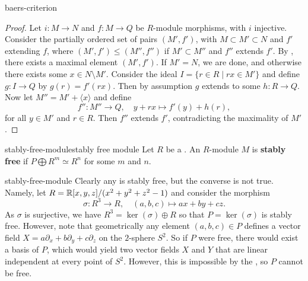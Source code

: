 \begin{example}{baers-criterion}
    \begin{proof}
        Let $i : M \to N$ and $f : M \to Q$ be $R$-module morphisms, with $i$ injective. Consider the partially ordered set of pairs $(M', f')$, with $M \subset M' \subset N$ and $f'$ extending $f$, where $(M', f') \le (M'', f'')$ if $M' \subset M''$ and $f''$ extends $f'$. By , there exists a maximal element $(M', f')$. If $M' = N$, we are done, and otherwise there exists some $x \in N \setminus M'$. Consider the ideal $I = \{ r \in R \mid rx \in M' \}$ and define $g : I \to Q$ by $g(r) = f'(rx)$. Then by assumption $g$ extends to some $h : R \to Q$. Now let $M'' = M' + \langle x \rangle$ and define
        \[ f'' : M'' \to Q, \quad y + rx \mapsto f'(y) + h(r) , \]
        for all $y \in M'$ and $r \in R$. Then $f''$ extends $f'$, contradicting the maximality of $M'$.
    \end{proof}
\end{example}

\begin{topic}{stably-free-module}{stably free module}
    Let $R$ be a . An $R$-module $M$ is \textbf{stably free} if $P \bigoplus R^m \simeq R^n$ for some $m$ and $n$.
\end{topic}

\begin{example}{stably-free-module}
    Clearly any  is stably free, but the converse is not true. Namely, let $R = \mathbb{R}[x, y, z] / (x^2 + y^2 + z^2 - 1)$ and consider the morphism
    \[ \sigma : R^3 \to R, \quad (a, b, c) \mapsto ax + by + cz . \]
    As $\sigma$ is surjective, we have $R^3 = \ker(\sigma) \oplus R$ so that $P = \ker(\sigma)$ is stably free. However, note that geometrically any element $(a, b, c) \in P$ defines a vector field $X = a \partial_x + b \partial_y + c \partial_z$ on the $2$-sphere $S^2$. So if $P$ were free, there would exist a basis of $P$, which would yield two vector fields $X$ and $Y$ that are linear independent at every point of $S^2$. However, this is impossible by the , so $P$ cannot be free.
\end{example}
